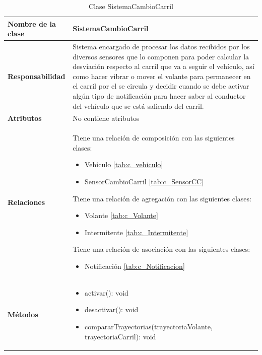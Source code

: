 \begin{table}[h]
\begin{center}
\begin{tabular}{p{} p{11cm}}
\textbf{Nombre de la clase} &  SistemaCambioCarril\\ \hline \hline
\textbf{Responsabilidad} &  Sistema encargado de procesar los datos recibidos por los diversos sensores que lo componen para poder calcular la desviación respecto al carril que va a seguir el vehículo, así como hacer vibrar o mover el volante para permanecer en el carril por el se circula y decidir cuando se debe activar algún tipo de notificación para hacer saber al conductor del vehículo que se está saliendo del carril. \\ \hline
\textbf{Atributos} & No contiene atributos
                      \\ \hline
\textbf{Relaciones} &

                      \par Tiene una relación de composición con las siguientes clases:
                      \begin{itemize}
                        \item Vehículo \ref{tab:c_vehiculo}
                        \item SensorCambioCarril \ref{tab:c_SensorCC}
                      \end{itemize}

                      \par Tiene una relación de agregación con las siguientes clases:
                        \begin{itemize}
                          \item Volante \ref{tab:c_Volante}
                          \item Intermitente \ref{tab:c_Intermitente}
                        \end{itemize}

                        \par Tiene una relación de asociación con las siguientes clases:
                        \begin{itemize}
                          \item Notificación \ref{tab:c_Notificacion}
                        \end{itemize}

                      \\ \hline

\textbf{Métodos} &  \begin{itemize}
                      \item activar(): void
                      \item desactivar(): void
                      \item compararTrayectorias(trayectoriaVolante, trayectoriaCarril): void
                    \end{itemize}\\ \hline
\end{tabular}
\caption{Clase SistemaCambioCarril}
\label{tab:c_SCarril}
\end{center}
\end{table}
